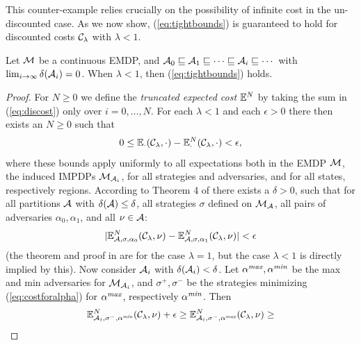 \documentclass{llncs}
\begin{document}
This counter-example relies crucially on the possibility of infinite cost in the un-discounted
case. As we now show, (\ref{eq:tightbounds}) is guaranteed to hold for discounted costs $\mathcal{C}_\lambda$
with $\lambda<1$.


\begin{theorem}
\label{prop:narrowbounds}
Let $\mathcal{M}$ be a continuous EMDP, and
$\mathcal{A}_0\sqsubseteq\mathcal{A}_1\sqsubseteq \cdots\sqsubseteq  \mathcal{A}_i\sqsubseteq\cdots$ with
$\lim_{i\rightarrow\infty}\delta(\mathcal{A}_i)= 0$. When $\lambda<1$, then  (\ref{eq:tightbounds}) holds.
\end{theorem}

\begin{proof}
 For $N\geq 0$ we define
 the \emph{truncated expected cost} $\mathbb{E}^N$
 by taking the sum in (\ref{eq:discost}) only over $i=0,\ldots,N$. For each $\lambda<1$ and each
 $\epsilon>0$ there then exists an $N\geq 0$ such that
 \begin{equation}
 \label{eq:local390}
 0\leq \mathbb{E}_{\cdot}(\mathcal{C}_{\lambda},\cdot)- \mathbb{E}^N_{\cdot}(\mathcal{C}_{\lambda},\cdot)<\epsilon,
\end{equation}
  where
 these bounds apply uniformly to all expectations both in the EMDP $\mathcal{M}$, the induced IMPDPs $\mathcal{M}_{\mathcal{A}_i}$,
 for all strategies and adversaries, and for all states, respectively regions. According to Theorem 4 of
 \cite{jaeger2020approximating} there exists a $\delta>0$, such that for all partitions $\mathcal{A}$ with
 $\delta(\mathcal{A})\leq \delta$, all strategies $\sigma$ defined on $\mathcal{M}_{\mathcal{A}}$, all pairs of
 adversaries $\alpha_0,\alpha_1$, and all $\nu\in\mathcal{A}$:
 \begin{equation}
 \label{eq:local400}
 |\mathbb{E}^N_{\mathcal{A},\sigma,\alpha_0}(\mathcal{C}_{\lambda},\nu)-\mathbb{E}^N_{\mathcal{A},\sigma,\alpha_1}(\mathcal{C}_{\lambda},\nu)|<\epsilon
\end{equation}
(the theorem and proof in \cite{jaeger2020approximating} are for the case $\lambda=1$, but the case
$\lambda<1$ is directly implied by this). Now consider $\mathcal{A}_i$ with $\delta(\mathcal{A}_i)<\delta$.
Let $\alpha^{\emph{max}},\alpha^{\emph{min}}$ be the max and min adversaries for $\mathcal{M}_{\mathcal{A}_i}$, and $\sigma^+,\sigma^-$ be
the strategies minimizing (\ref{eq:costforalpha}) for  $\alpha^{\emph{max}}$, respectively $\alpha^{\emph{min}}$.
Then
\begin{multline}
\expected^N_{\partition_i,\sigma^-,\alphamin}(\costlambda,\nu)+\epsilon\geq
\expected^N_{\partition_i,\sigma^-,\alphamax}(\costlambda,\nu)\geq \\

\end{multline}
\end{proof}
\end{document}
